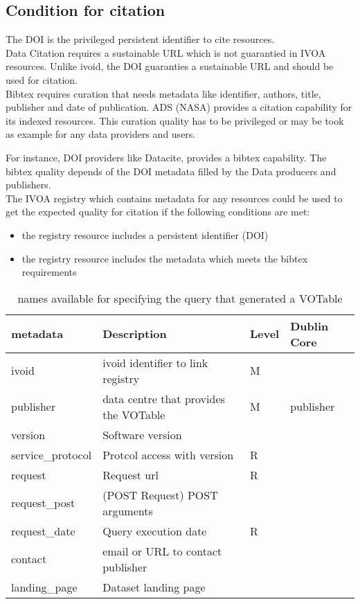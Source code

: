 \documentclass[11pt,a4paper]{ivoa}
\begin{document}
\subsection{Condition for citation}

The DOI is the privileged persistent identifier to cite resources.\\

Data Citation requires a sustainable URL which is not guarantied in IVOA resources.
Unlike ivoid, the DOI guaranties a sustainable URL and should be used for citation. \\

Bibtex requires curation that needs metadata like identifier, authors, title, publisher and date of publication.
ADS (NASA) provides a citation capability for its indexed resources. This curation quality has to be privileged or may be took as example for any data providers and users.

For instance, DOI providers like Datacite, provides a bibtex capability. The bibtex quality depends of the DOI metadata filled by the Data producers and publishers.\\

The IVOA registry which contains metadata for any resources could be used to get the expected quality for citation if the following conditions are met:
\begin{itemize}
\item the registry resource includes a persistent identifier (DOI)
\item the registry resource includes the metadata which meets the bibtex requirements
\end{itemize}

\begin{table}
\begin{tabular}{|l|l|l|l|}  \hline
\textbf{metadata} & \textbf{Description} & \textbf{Level} & \textbf{Dublin Core}\\ \hline
ivoid             & ivoid identifier to link registry & M &  \\ \hline
publisher         & data centre that provides the VOTable & M & publisher\\ \hline
version           & Software version  & & \\ \hline
service\_protocol & Protcol access with version & R& \\ \hline
request           & Request url &  R& \\ \hline
request\_post     & (POST Request) POST arguments &  & \\ \hline
request\_date     & Query execution date & R&\\ \hline	
contact           & email or URL to contact publisher & & \\ \hline	
landing\_page     & Dataset landing page & & \\ \hline
\end{tabular}
\caption{ names available for specifying the query that
generated a VOTable}
\label{tab:query-names}
\end{table}
\end{document}
